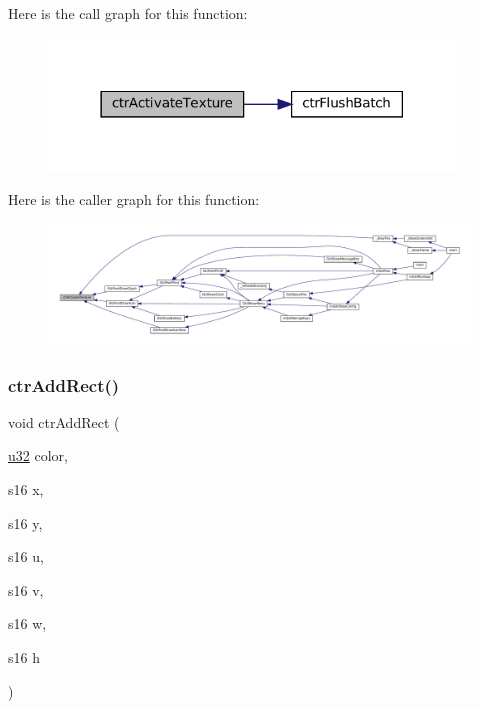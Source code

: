 Here is the call graph for this function\+:
\nopagebreak
\begin{figure}[H]
\begin{center}
\leavevmode
\includegraphics[width=306pt]{ctr-gpu_8c_aad6f8dfb30a010444bf5c7420904d852_cgraph}
\end{center}
\end{figure}
Here is the caller graph for this function\+:
\nopagebreak
\begin{figure}[H]
\begin{center}
\leavevmode
\includegraphics[width=350pt]{ctr-gpu_8c_aad6f8dfb30a010444bf5c7420904d852_icgraph}
\end{center}
\end{figure}
\mbox{\label{ctr-gpu_8c_a5a8136bc8fce40ba12da3cfaaa617bd4}} 
\subsubsection{\texorpdfstring{ctr\+Add\+Rect()}{ctrAddRect()}}
{\footnotesize\ttfamily void ctr\+Add\+Rect (\begin{DoxyParamCaption}\item[{\mbox{\hyperlink{sqlite3_8c_a03ad5adfaeb9b7640dde78a0cc390319}{u32}}}]{color,  }\item[{s16}]{x,  }\item[{s16}]{y,  }\item[{s16}]{u,  }\item[{s16}]{v,  }\item[{s16}]{w,  }\item[{s16}]{h }\end{DoxyParamCaption})}

